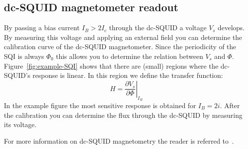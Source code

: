 \subsection{dc-SQUID magnetometer readout}
By passing a bias current $I_B > 2I_c$ through the dc-SQUID a voltage $V_s$ develops. By measuring this voltage and applying an external field you can determine the calibration curve of the dc-SQUID magnetometer. Since the periodicity of the SQI is always $\Phi_0$ this allows you to determine the relation between $V_s$ and $\Phi$. Figure~\ref{fig:example-SQI} shows that there are (small) regions where the dc-SQUID's response is linear. In this region we define the transfer function\cite{rogSQUIDontipMagneticMicroscopy2022}:
\begin{equation}
	H = \left. \frac{\partial V_s}{\partial \Phi} \right|_{I_B}
\end{equation}
In the example figure the most sensitive response is obtained for $I_B = 2i$. After the calibration you can determine the flux through the dc-SQUID by measuring its voltage.

For more information on dc-SQUID magnetometry the reader is referred to~\cite{tinkhamIntroductionSuperconductivity,clarkeSQUIDHandbook2004,schmelzSuperconductingQuantumInterference2017}.